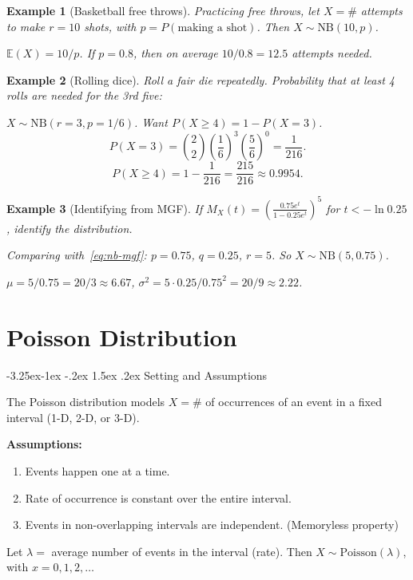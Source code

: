 \documentclass{article}
\makeatletter
\newtheorem{example}{Example}[section]
\theoremstyle{remark}
\newlength{\subsecindent}
\renewcommand\subsection{\@startsection{subsection}{2}{\subsecindent}%
  {-3.25ex\@plus -1ex \@minus -.2ex}%
  {1.5ex \@plus .2ex}%
  {\normalfont\large\bfseries}}
\newenvironment{sub}{%
  \begin{list}{}{%
    \setlength{\leftmargin}{4em}%
    \setlength{\rightmargin}{0pt}%
    \setlength{\topsep}{0pt}%
    \setlength{\partopsep}{0pt}%
    \setlength{\parsep}{\parskip}%
    \setlength{\itemsep}{\parskip}%
  }\item\relax
}{\end{list}}
\newcommand{\E}{\mathbb{E}}
\makeatother
\begin{document}
\begin{sub}
\begin{example}[Basketball free throws]
  \label{ex:nb-basketball}
  Practicing free throws, let $X = \#$ attempts to make $r = 10$ shots,
  with $p = P(\text{making a shot})$.
  Then $X \sim \text{NB}(10, p)$.

  $\E(X) = 10/p$. If $p = 0.8$, then on average $10/0.8 = 12.5$ attempts needed.
\end{example}

\begin{example}[Rolling dice]
  Roll a fair die repeatedly. Probability that at least 4 rolls are needed for the 3rd five:

  $X \sim \text{NB}(r=3, p=1/6)$. Want $P(X \ge 4) = 1 - P(X = 3)$.
  \[
    P(X = 3) = \binom{2}{2}\left(\frac{1}{6}\right)^3 \left(\frac{5}{6}\right)^0 = \frac{1}{216}.
  \]
  \[
    P(X \ge 4) = 1 - \frac{1}{216} = \frac{215}{216} \approx 0.9954.
  \]
\end{example}

\begin{example}[Identifying from MGF]
  If $M_X(t) = \left(\frac{0.75 e^t}{1 - 0.25 e^t}\right)^5$ for $t < -\ln 0.25$,
  identify the distribution.

  Comparing with~\eqref{eq:nb-mgf}: $p = 0.75$, $q = 0.25$, $r = 5$.
  So $X \sim \text{NB}(5, 0.75)$.

  $\mu = 5/0.75 = 20/3 \approx 6.67$, \;
  $\sigma^2 = 5 \cdot 0.25 / 0.75^2 = 20/9 \approx 2.22$.
\end{example}

\end{sub}

\section{Poisson Distribution}
\label{sec:det-poisson}

\subsection{Setting and Assumptions}
\begin{sub}

The Poisson distribution models $X = \#$ of occurrences of an event in a
fixed interval (1-D, 2-D, or 3-D).

\textbf{Assumptions:}
\begin{enumerate}
  \item Events happen one at a time.
  \item Rate of occurrence is constant over the entire interval.
  \item Events in non-overlapping intervals are independent. \quad (Memoryless property)
\end{enumerate}

Let $\lambda =$ average number of events in the interval (rate).
Then $X \sim \text{Poisson}(\lambda)$, with $x = 0, 1, 2, \ldots$

\end{sub}
\end{document}
